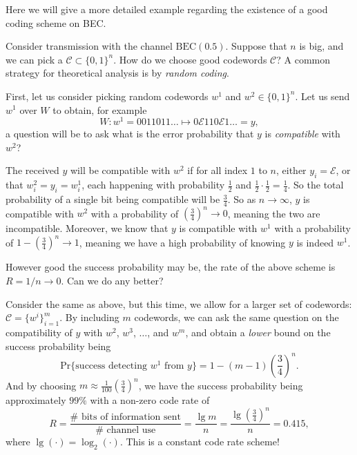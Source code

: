 Here we will give a more detailed example regarding the existence of a good coding scheme on BEC.
\begin{example}
    Consider transmission with the channel $\mathrm{BEC}(0.5)$. Suppose that $n$ is big, and we can pick a $\mathcal{C}\subset\{0,1\}^n$. How do we choose good codewords $\mathcal{C}$? A common strategy for theoretical analysis is by \textit{random coding}.

    First, let us consider picking random codewords $w^1$ and $w^2\in\{0,1\}^n$. Let us send $w^1$ over $W$ to obtain, for example
    \begin{equation*}
        W:w^1 = 0011011\ldots \mapsto 0\mathcal{E}110\mathcal{E}1\ldots=y,
    \end{equation*}
    a question will be to ask what is the error probability that $y$ is \textit{compatible} with $w^2$?

    The received $y$ will be compatible with $w^2$ if for all index $1$ to $n$, either $y_i=\mathcal{E}$, or that $w^2_i=y_i=w^1_i$, each happening with probability $\frac{1}{2}$ and $\frac{1}{2}\cdot\frac{1}{2}=\frac{1}{4}$. So the total probability of a single bit being compatible will be $\frac{3}{4}$. So as $n\rightarrow \infty$, $y$ is compatible with $w^2$ with a probability of $\left(\frac{3}{4}\right)^n\rightarrow0$, meaning the two are incompatible. Moreover, we know that $y$ is compatible with $w^1$ with a probability of $1-\left(\frac{3}{4}\right)^n\rightarrow1$, meaning we have a high probability of knowing $y$ is indeed $w^1$.

    
\end{example}
However good the success probability may be, the rate of the above scheme is $R=1/n\rightarrow 0$. Can we do any better?
\begin{example}
    Consider the same as above, but this time, we allow for a larger set of codewords: $\mathcal{C}=\{w^i\}_{i=1}^m$. By including $m$ codewords, we can ask the same question on the compatibility of $y$ with $w^2$, $w^3$, $\ldots$, and $w^m$, and obtain a \textit{lower} bound on the success probability being
    \begin{equation*}
        \mathrm{Pr}\{\text{success detecting $w^1$ from $y$}\} = 1-(m-1)\left(\frac{3}{4}\right)^n.
    \end{equation*}
    And by choosing $m\approx\frac{1}{100}\left(\frac{3}{4}\right)^n$, we have the success probability being approximately $99\%$ with a non-zero code rate of
    \begin{equation*}
        R = \frac{\# \text{ bits of information sent}}{\# \text{ channel use}} = \frac{\lg m}{n} = \frac{\lg\left(\frac{3}{4}\right)^n}{n} = 0.415,
    \end{equation*}
    where $\lg(\cdot)=\log_2(\cdot)$. This is a constant code rate scheme!
\end{example}
